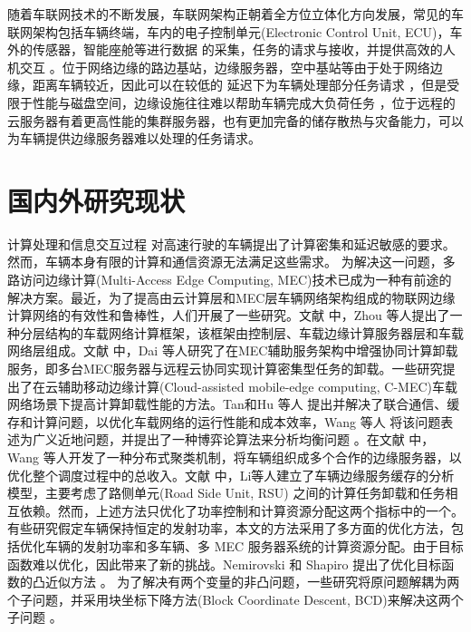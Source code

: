 随着车联网技术的不断发展，车联网架构正朝着全方位立体化方向发展，常见的车联网架构包括车辆终端，车内的电子控制单元(Electronic Control Unit, ECU)，车外的传感器，智能座舱等进行数据
的采集，任务的请求与接收，并提供高效的人机交互 \supercite{Edge10213996}。位于网络边缘的路边基站，边缘服务器，空中基站等由于处于网络边缘，距离车辆较近，因此可以在较低的
延迟下为车辆处理部分任务请求 \supercite{EdgeComputing2019,Autonomous9756370}，但是受限于性能与磁盘空间，边缘设施往往难以帮助车辆完成大负荷任务
，位于远程的云服务器有着更高性能的集群服务器，也有更加完备的储存散热与灾备能力，可以为车辆提供边缘服务器难以处理的任务请求。

\section{国内外研究现状}\label{section1-2}
计算处理和信息交互过程 对高速行驶的车辆提出了计算密集和延迟敏感的要求。然而，车辆本身有限的计算和通信资源无法满足这些需求。
为解决这一问题，多路访问边缘计算(Multi-Access Edge Computing, MEC)技术已成为一种有前途的解决方案。最近，为了提高由云计算层和MEC层车辆网络架构组成的物联网边缘计算网络的有效性和鲁棒性，人们开展了一些研究。文献 \cite{Zhou2019}中，Zhou 等人提出了一种分层结构的车载网络计算框架，该框架由控制层、车载边缘计算服务器层和车载网络层组成。文献 \cite{Dai2022}中，Dai 等人研究了在MEC辅助服务架构中增强协同计算卸载服务，即多台MEC服务器与远程云协同实现计算密集型任务的卸载。一些研究提出了在云辅助移动边缘计算(Cloud-assisted mobile-edge computing, C-MEC)车载网络场景下提高计算卸载性能的方法。Tan和Hu 等人 \supercite{Tan2018}提出并解决了联合通信、缓存和计算问题，以优化车载网络的运行性能和成本效率，Wang 等人 将该问题表述为广义近地问题，并提出了一种博弈论算法来分析均衡问题 \supercite{Wang2020}。在文献 \cite{Wang2022}中， Wang 等人开发了一种分布式聚类机制，将车辆组织成多个合作的边缘服务器，以优化整个调度过程中的总收入。文献 \cite{Li2023}中，Li等人建立了车辆边缘服务缓存的分析模型，主要考虑了路侧单元(Road Side Unit, RSU) 之间的计算任务卸载和任务相互依赖。然而，上述方法只优化了功率控制和计算资源分配这两个指标中的一个。有些研究假定车辆保持恒定的发射功率，本文的方法采用了多方面的优化方法，包括优化车辆的发射功率和多车辆、多 MEC 服务器系统的计算资源分配。由于目标函数难以优化，因此带来了新的挑战。Nemirovski 和 Shapiro 提出了优化目标函数的凸近似方法 \supercite{Nemirovski2007}。 为了解决有两个变量的非凸问题，一些研究将原问题解耦为两个子问题，并采用块坐标下降方法(Block Coordinate Descent, BCD)来解决这两个子问题 \supercite{bertsekas1999nonlinear}。
